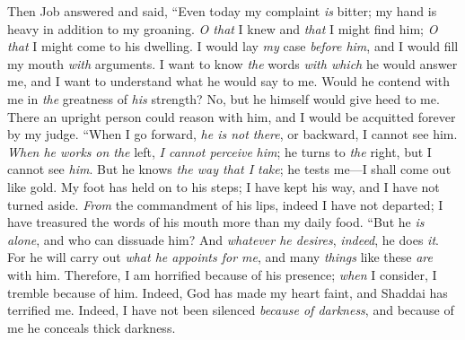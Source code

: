 \begin{biblechapter} %
 Then Job answered and said,
\verse “Even today my complaint \textit{is} bitter; 
my hand is heavy in addition to my groaning.
\verse \textit{O that} I knew and \textit{that} I might find him; 
\textit{O that} I might come to his dwelling.
\verse I would lay \textit{my} case \textit{before him}, 
and I would fill my mouth \textit{with} arguments.
\verse I want to know \textit{the} words \textit{with which} he would answer me, 
and I want to understand what he would say to me.
\verse Would he contend with me in \textit{the} greatness of \textit{his} strength? 
No, but he himself would give heed to me.
\verse There an upright person could reason with him, 
and I would be acquitted forever by my judge.
\verse “When I go forward, \textit{he is not there}, 
or backward, I cannot see him.
\verse \textit{When he works} \textit{on the} left, \textit{I cannot perceive} \textit{him}; 
he turns to \textit{the} right, but I cannot see \textit{him}.
\verse But he knows \textit{the way that I take}; 
he tests me—I shall come out like gold.
\verse My foot has held on to his steps; 
I have kept his way, and I have not turned aside.
\verse \textit{From} the commandment of his lips, indeed I have not departed; 
I have treasured the words of his mouth more than my daily food.
\verse “But he \textit{is} \textit{alone}, and who can dissuade him? 
And \textit{whatever he desires}, \textit{indeed}, he does \textit{it}.
\verse For he will carry out \textit{what he appoints for me}, 
and many \textit{things} like these \textit{are} with him.
\verse Therefore, I am horrified because of his presence; 
\textit{when} I consider, I tremble because of him.
\verse Indeed, God has made my heart faint, 
and Shaddai has terrified me.
\verse Indeed, I have not been silenced \textit{because of darkness}, 
and because of me he conceals thick darkness.
\end{biblechapter}

